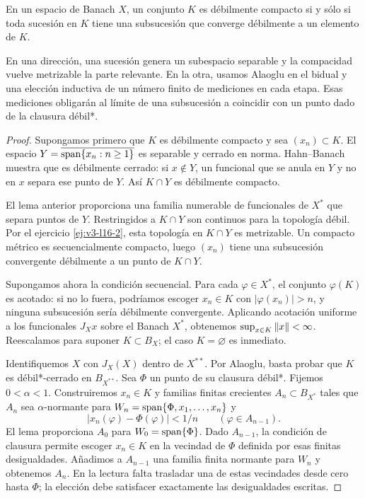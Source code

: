\begin{teorema}\label{v3:eberlein}
En un espacio de Banach $X$, un conjunto $K$ es débilmente compacto si y sólo si toda sucesión en $K$ tiene una subsucesión que converge débilmente a un elemento de $K$.
\end{teorema}
\begin{estrategia}
En una dirección, una sucesión genera un subespacio separable y la compacidad vuelve metrizable la parte relevante. En la otra, usamos Alaoglu en el bidual y una elección inductiva de un número finito de mediciones en cada etapa. Esas mediciones obligarán al límite de una subsucesión a coincidir con un punto dado de la clausura débil*.
\end{estrategia}
\begin{proof}
Supongamos primero que $K$ es débilmente compacto y sea $(x_n)\subset K$. El espacio $Y=\overline{\operatorname{span}\{x_n:n\geq1\}}$ es separable y cerrado en norma. Hahn--Banach muestra que es débilmente cerrado: si $x\notin Y$, un funcional que se anula en $Y$ y no en $x$ separa ese punto de $Y$. Así $K\cap Y$ es débilmente compacto.

El lema anterior proporciona una familia numerable de funcionales de $X^*$ que separa puntos de $Y$. Restringidos a $K\cap Y$ son continuos para la topología débil. Por el ejercicio \ref{ej:v3-l16-2}, esta topología en $K\cap Y$ es metrizable. Un compacto métrico es secuencialmente compacto, luego $(x_n)$ tiene una subsucesión convergente débilmente a un punto de $K\cap Y$.

Supongamos ahora la condición secuencial. Para cada $\varphi\in X^*$, el conjunto $\varphi(K)$ es acotado: si no lo fuera, podríamos escoger $x_n\in K$ con $|\varphi(x_n)|>n$, y ninguna subsucesión sería débilmente convergente. Aplicando acotación uniforme a los funcionales $J_Xx$ sobre el Banach $X^*$, obtenemos $\sup_{x\in K}\left\lVert x\right\rVert<\infty$. Reescalamos para suponer $K\subset B_X$; el caso $K=\varnothing$ es inmediato.

Identifiquemos $X$ con $J_X(X)$ dentro de $X^{**}$. Por Alaoglu, basta probar que $K$ es débil*-cerrado en $B_{X^{**}}$. Sea $\Phi$ un punto de su clausura débil*. Fijemos $0<\alpha<1$. Construiremos $x_n\in K$ y familias finitas crecientes $A_n\subset B_{X^*}$ tales que $A_n$ sea $\alpha$-normante para
$W_n=\operatorname{span}\{\Phi,x_1,\ldots,x_n\}$ y
\[
 |x_n(\varphi)-\Phi(\varphi)|<1/n\qquad(\varphi\in A_{n-1}).
\]
El lema proporciona $A_0$ para $W_0=\operatorname{span}\{\Phi\}$. Dado $A_{n-1}$, la condición de clausura permite escoger $x_n\in K$ en la vecindad de \emph{$\Phi$} definida por esas finitas desigualdades. Añadimos a $A_{n-1}$ una familia finita normante para $W_n$ y obtenemos $A_n$. En la lectura falta trasladar una de estas vecindades desde cero hasta $\Phi$; la elección debe satisfacer exactamente las desigualdades escritas.


\end{proof}
